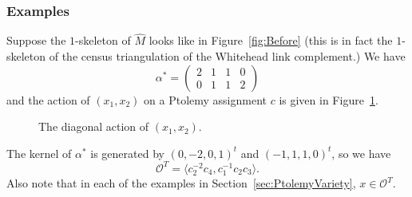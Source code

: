 \documentclass[12pt]{amsart}
\theoremstyle{definition}
\numberwithin{equation}{section}
\begin{document}
\subsubsection{Examples}
Suppose the $1$-skeleton of $\widehat M$ looks like in Figure~\ref{fig:Before} (this is in fact the $1$-skeleton of the census triangulation of the Whitehead link complement.) We have
\begin{equation}
\alpha^*=\begin{pmatrix}2&1&1&0\\0&1&1&2\end{pmatrix}
\end{equation}
and the action of $(x_1,x_2)$ on a Ptolemy assignment $c$ is given in Figure~\ref{fig:After}.
\begin{figure}[htpb]
\centering
\begin{minipage}[c]{0.48\textwidth}
\scalebox{0.85}{}
\captionsetup{width=10cm}
\caption{Ptolemy assignment.}\label{fig:Before}
\end{minipage}	
\begin{minipage}[c]{0.48\textwidth}
\scalebox{0.85}{}
\captionsetup{width=10cm}
\caption{The diagonal action of $(x_1,x_2)$.}\label{fig:After}
\end{minipage}					
\end{figure}
The kernel of $\alpha^*$ is generated by $(0,-2,0,1)^t$ and $(-1,1,1,0)^t$, so we have
\begin{equation}
\mathcal O^T=\langle c_2^{-2}c_4,c_1^{-1}c_2c_3\rangle.
\end{equation}
Also note that in each of the examples in Section~\ref{sec:PtolemyVariety}, $x\in\mathcal O^T$.
\end{document}
